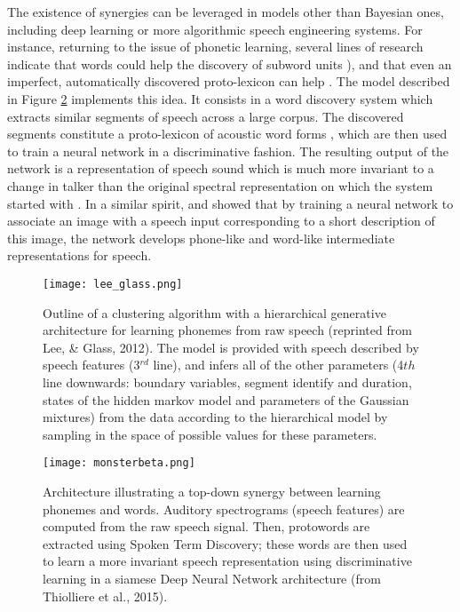 \documentclass[jou,apacite]{apa6}
\begin{document}
The existence of  synergies can be leveraged in models other than Bayesian ones, including deep learning or  more algorithmic speech engineering systems. 
For instance, returning to the issue of phonetic learning, several lines of research indicate that words could help the discovery of subword units \cite{swingley_2009, thiessen_2007}), and that even an imperfect, automatically discovered proto-lexicon can help \cite{martin_2012, fourtassi2014c}. The model described in Figure \ref{fig:monsterbeta} implements this idea. It consists in a word discovery system which extracts similar segments of speech across a large corpus. The discovered segments constitute a proto-lexicon of acoustic word forms \cite{jansen_2013b}, which are then used to train a neural network in a discriminative fashion. The resulting output of the network is a representation of speech sound which is much more invariant to a change in talker than the original spectral representation on which the system started with \cite{thiolliere_2015}.  
In a similar spirit,  and  showed that by training a neural network to associate an image with a speech input corresponding to a short description of this image, the network develops phone-like and word-like intermediate representations for speech. 




\begin{figure}
	\centering
	\texttt{[image: lee\_glass.png]}
	\caption{Outline of a clustering algorithm with a hierarchical generative architecture for learning phonemes from raw speech (reprinted from Lee, \& Glass, 2012). The model is provided with speech described by speech features (3$^{rd}$ line), and infers all of the other parameters (4${th}$ line downwards: boundary variables, segment identify and duration, states of the hidden markov model and parameters of the Gaussian mixtures) from the data according to the hierarchical model by sampling in the space of possible values for these parameters.}
	\label{fig:glass}
\end{figure}

\begin{figure}
	\centering
	\texttt{[image: monsterbeta.png]}
	\caption{Architecture illustrating a top-down synergy between learning phonemes and words. Auditory spectrograms (speech features) are computed from the raw speech signal. Then, protowords are extracted using Spoken Term Discovery; these words are then used to learn a more invariant speech representation using discriminative learning in a siamese Deep Neural Network architecture (from Thiolliere et al., 2015).}
	\label{fig:monsterbeta}
\end{figure}
\end{document}
